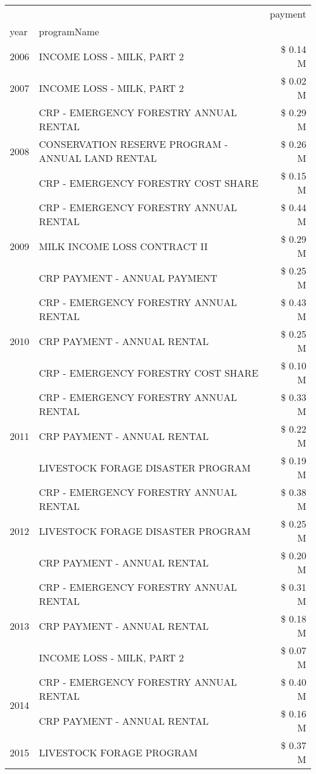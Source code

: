 \begin{tabular}{llr}
\toprule
 &  & payment \\
year & programName &  \\
\midrule
2006 & INCOME LOSS - MILK, PART 2 & \$ 0.14 M \\
\cline{1-3}
2007 & INCOME LOSS - MILK, PART 2 & \$ 0.02 M \\
\cline{1-3}
\multirow[t]{3}{*}{2008} & CRP - EMERGENCY FORESTRY ANNUAL RENTAL & \$ 0.29 M \\
 & CONSERVATION RESERVE PROGRAM - ANNUAL LAND RENTAL & \$ 0.26 M \\
 & CRP - EMERGENCY FORESTRY COST SHARE & \$ 0.15 M \\
\cline{1-3}
\multirow[t]{3}{*}{2009} & CRP - EMERGENCY FORESTRY ANNUAL RENTAL & \$ 0.44 M \\
 & MILK INCOME LOSS CONTRACT II & \$ 0.29 M \\
 & CRP PAYMENT - ANNUAL PAYMENT & \$ 0.25 M \\
\cline{1-3}
\multirow[t]{3}{*}{2010} & CRP - EMERGENCY FORESTRY ANNUAL RENTAL & \$ 0.43 M \\
 & CRP PAYMENT - ANNUAL RENTAL & \$ 0.25 M \\
 & CRP - EMERGENCY FORESTRY COST SHARE & \$ 0.10 M \\
\cline{1-3}
\multirow[t]{3}{*}{2011} & CRP - EMERGENCY FORESTRY ANNUAL RENTAL & \$ 0.33 M \\
 & CRP PAYMENT - ANNUAL RENTAL & \$ 0.22 M \\
 & LIVESTOCK FORAGE DISASTER PROGRAM & \$ 0.19 M \\
\cline{1-3}
\multirow[t]{3}{*}{2012} & CRP - EMERGENCY FORESTRY ANNUAL RENTAL & \$ 0.38 M \\
 & LIVESTOCK FORAGE DISASTER PROGRAM & \$ 0.25 M \\
 & CRP PAYMENT - ANNUAL RENTAL & \$ 0.20 M \\
\cline{1-3}
\multirow[t]{3}{*}{2013} & CRP - EMERGENCY FORESTRY ANNUAL RENTAL & \$ 0.31 M \\
 & CRP PAYMENT - ANNUAL RENTAL & \$ 0.18 M \\
 & INCOME LOSS - MILK, PART 2 & \$ 0.07 M \\
\cline{1-3}
\multirow[t]{2}{*}{2014} & CRP - EMERGENCY FORESTRY ANNUAL RENTAL & \$ 0.40 M \\
 & CRP PAYMENT - ANNUAL RENTAL & \$ 0.16 M \\
\cline{1-3}
\multirow[t]{3}{*}{2015} & LIVESTOCK FORAGE PROGRAM & \$ 0.37 M \\

\end{tabular}

